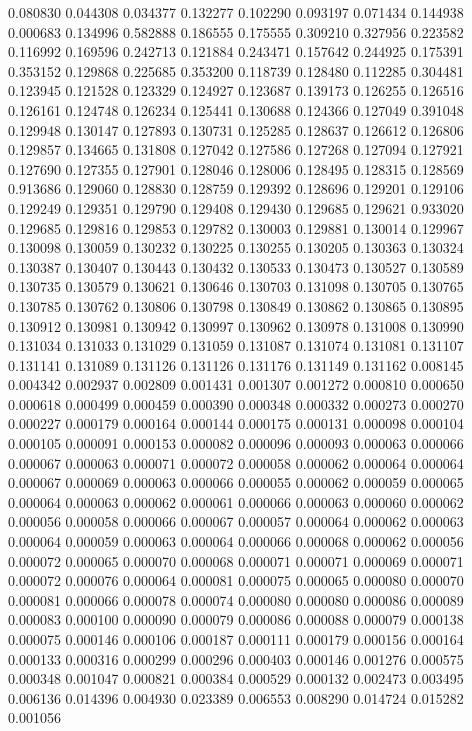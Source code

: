 0.080830
0.044308
0.034377
0.132277
0.102290
0.093197
0.071434
0.144938
0.000683
0.134996
0.582888
0.186555
0.175555
0.309210
0.327956
0.223582
0.116992
0.169596
0.242713
0.121884
0.243471
0.157642
0.244925
0.175391
0.353152
0.129868
0.225685
0.353200
0.118739
0.128480
0.112285
0.304481
0.123945
0.121528
0.123329
0.124927
0.123687
0.139173
0.126255
0.126516
0.126161
0.124748
0.126234
0.125441
0.130688
0.124366
0.127049
0.391048
0.129948
0.130147
0.127893
0.130731
0.125285
0.128637
0.126612
0.126806
0.129857
0.134665
0.131808
0.127042
0.127586
0.127268
0.127094
0.127921
0.127690
0.127355
0.127901
0.128046
0.128006
0.128495
0.128315
0.128569
0.913686
0.129060
0.128830
0.128759
0.129392
0.128696
0.129201
0.129106
0.129249
0.129351
0.129790
0.129408
0.129430
0.129685
0.129621
0.933020
0.129685
0.129816
0.129853
0.129782
0.130003
0.129881
0.130014
0.129967
0.130098
0.130059
0.130232
0.130225
0.130255
0.130205
0.130363
0.130324
0.130387
0.130407
0.130443
0.130432
0.130533
0.130473
0.130527
0.130589
0.130735
0.130579
0.130621
0.130646
0.130703
0.131098
0.130705
0.130765
0.130785
0.130762
0.130806
0.130798
0.130849
0.130862
0.130865
0.130895
0.130912
0.130981
0.130942
0.130997
0.130962
0.130978
0.131008
0.130990
0.131034
0.131033
0.131029
0.131059
0.131087
0.131074
0.131081
0.131107
0.131141
0.131089
0.131126
0.131126
0.131176
0.131149
0.131162
0.008145
0.004342
0.002937
0.002809
0.001431
0.001307
0.001272
0.000810
0.000650
0.000618
0.000499
0.000459
0.000390
0.000348
0.000332
0.000273
0.000270
0.000227
0.000179
0.000164
0.000144
0.000175
0.000131
0.000098
0.000104
0.000105
0.000091
0.000153
0.000082
0.000096
0.000093
0.000063
0.000066
0.000067
0.000063
0.000071
0.000072
0.000058
0.000062
0.000064
0.000064
0.000067
0.000069
0.000063
0.000066
0.000055
0.000062
0.000059
0.000065
0.000064
0.000063
0.000062
0.000061
0.000066
0.000063
0.000060
0.000062
0.000056
0.000058
0.000066
0.000067
0.000057
0.000064
0.000062
0.000063
0.000064
0.000059
0.000063
0.000064
0.000066
0.000068
0.000062
0.000056
0.000072
0.000065
0.000070
0.000068
0.000071
0.000071
0.000069
0.000071
0.000072
0.000076
0.000064
0.000081
0.000075
0.000065
0.000080
0.000070
0.000081
0.000066
0.000078
0.000074
0.000080
0.000080
0.000086
0.000089
0.000083
0.000100
0.000090
0.000079
0.000086
0.000088
0.000079
0.000138
0.000075
0.000146
0.000106
0.000187
0.000111
0.000179
0.000156
0.000164
0.000133
0.000316
0.000299
0.000296
0.000403
0.000146
0.001276
0.000575
0.000348
0.001047
0.000821
0.000384
0.000529
0.000132
0.002473
0.003495
0.006136
0.014396
0.004930
0.023389
0.006553
0.008290
0.014724
0.015282
0.001056
